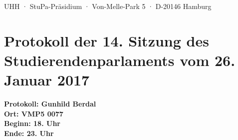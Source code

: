 \documentclass[ngerman,headheight=70pt]{scrartcl}
\begin{document}
    UHH · StuPa-Präsidium · Von-Melle-Park 5 · D-20146 Hamburg

    \section*{Protokoll der 14. Sitzung des Studierendenparlaments vom 26. Januar 2017}

    \textbf{Protokoll: Gunhild Berdal}\\
    \textbf{Ort: VMP5 0077}\\
    \textbf{Beginn: 18. Uhr}\\
    \textbf{Ende: 23. Uhr}

    \vspace{0.5cm}
\end{document}
